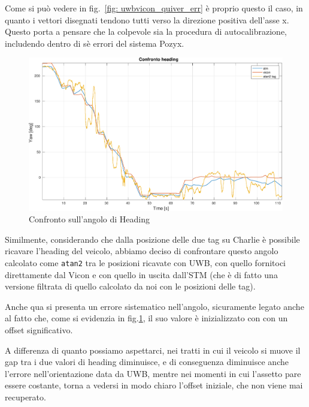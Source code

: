 Come si pu\`o vedere in fig.~\ref{fig: uwbvicon_quiver_err} \`e proprio questo il caso, in quanto i vettori disegnati tendono tutti verso la direzione positiva dell'asse x.
Questo porta a pensare che la colpevole sia la procedura di autocalibrazione, includendo dentro di s\`e errori del sistema Pozyx.

\vspace{0.5cm}

\begin{figure}[h]
	\centering
	\includegraphics[height=0.25\textheight]{figs/grafici_uwbvicon/uwbvicon_heading.pdf}
	\caption{Confronto sull'angolo di Heading }
	\label{fig: uwbvicon_heading}
\end{figure}

Similmente, considerando che dalla posizione delle due tag su Charlie è possibile ricavare l'heading del veicolo, abbiamo deciso di confrontare questo angolo calcolato come \verb|atan2| tra le posizioni ricavate con UWB, con quello fornitoci direttamente dal Vicon e con quello in uscita dall'STM (che è di fatto una versione filtrata di quello calcolato da noi con le posizioni delle tag). 

Anche qua si presenta un errore sistematico nell'angolo, sicuramente legato anche al fatto che, come si evidenzia in fig.\ref{fig: uwbvicon_heading}, il suo valore \`e inizializzato con con un offset significativo. 

A differenza di quanto possiamo aspettarci, nei tratti in cui il veicolo si muove il gap tra i due valori di heading diminuisce, e di conseguenza diminuisce anche l'errore nell'orientazione data da UWB, mentre nei momenti in cui l'assetto pare essere costante, torna a vedersi in modo chiaro l'offset iniziale, che non viene mai recuperato.

